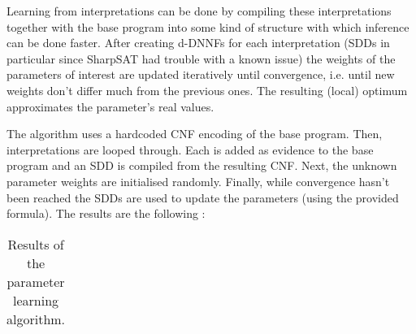 

Learning from interpretations can be done by compiling these interpretations together with the base program into some kind of structure with which inference can be done faster. After creating d-DNNFs for each interpretation (SDDs in particular since SharpSAT had trouble with a known issue) the weights of the parameters of interest are updated iteratively until convergence, i.e. until new weights don't differ much from the previous ones. The resulting (local) optimum approximates the parameter's real values.\\

\par\noindent The algorithm uses a hardcoded CNF encoding of the base program. Then, interpretations are looped through. Each is added as evidence to the base program and an SDD is compiled from the resulting CNF. Next, the unknown parameter weights are initialised randomly. Finally, while convergence hasn't been reached the SDDs are used to update the parameters (using the provided formula). The results are the following :

\begin{table}[h]
\centering
\begin{tabular}{ccc}
& &\\\hline
\end{tabular}
\caption{Results of the parameter learning algorithm.}
\label{plres}
\end{table}
